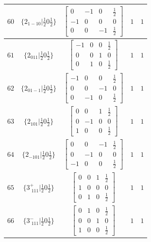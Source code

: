 \documentclass[fleqn,8pt]{jsarticle}
\begin{document}
\begin{longtable}{ccccc}
$ 60 $ & $ \{2{}_{1-10}|\frac{1}{2} 0 \frac{1}{2}\} $ & $ \begin{bmatrix} 0 & -1 & 0 & \frac{1}{2} \\ -1 & 0 & 0 & 0 \\ 0 & 0 & -1 & \frac{1}{2} \end{bmatrix} $ & $ 1 $ & $ 1 $ \\ \hline
$ 61 $ & $ \{2{}_{011}|\frac{1}{2} 0 \frac{1}{2}\} $ & $ \begin{bmatrix} -1 & 0 & 0 & \frac{1}{2} \\ 0 & 0 & 1 & 0 \\ 0 & 1 & 0 & \frac{1}{2} \end{bmatrix} $ & $ 1 $ & $ 1 $ \\ \hline
$ 62 $ & $ \{2{}_{01-1}|\frac{1}{2} 0 \frac{1}{2}\} $ & $ \begin{bmatrix} -1 & 0 & 0 & \frac{1}{2} \\ 0 & 0 & -1 & 0 \\ 0 & -1 & 0 & \frac{1}{2} \end{bmatrix} $ & $ 1 $ & $ 1 $ \\ \hline
$ 63 $ & $ \{2{}_{101}|\frac{1}{2} 0 \frac{1}{2}\} $ & $ \begin{bmatrix} 0 & 0 & 1 & \frac{1}{2} \\ 0 & -1 & 0 & 0 \\ 1 & 0 & 0 & \frac{1}{2} \end{bmatrix} $ & $ 1 $ & $ 1 $ \\ \hline
$ 64 $ & $ \{2{}_{-101}|\frac{1}{2} 0 \frac{1}{2}\} $ & $ \begin{bmatrix} 0 & 0 & -1 & \frac{1}{2} \\ 0 & -1 & 0 & 0 \\ -1 & 0 & 0 & \frac{1}{2} \end{bmatrix} $ & $ 1 $ & $ 1 $ \\ \hline
$ 65 $ & $ \{3^{+}_{\,\,111}|\frac{1}{2} 0 \frac{1}{2}\} $ & $ \begin{bmatrix} 0 & 0 & 1 & \frac{1}{2} \\ 1 & 0 & 0 & 0 \\ 0 & 1 & 0 & \frac{1}{2} \end{bmatrix} $ & $ 1 $ & $ 1 $ \\ \hline
$ 66 $ & $ \{3^{-}_{\,\,111}|\frac{1}{2} 0 \frac{1}{2}\} $ & $ \begin{bmatrix} 0 & 1 & 0 & \frac{1}{2} \\ 0 & 0 & 1 & 0 \\ 1 & 0 & 0 & \frac{1}{2} \end{bmatrix} $ & $ 1 $ & $ 1 $ \\ \hline

\end{longtable}
\end{document}
